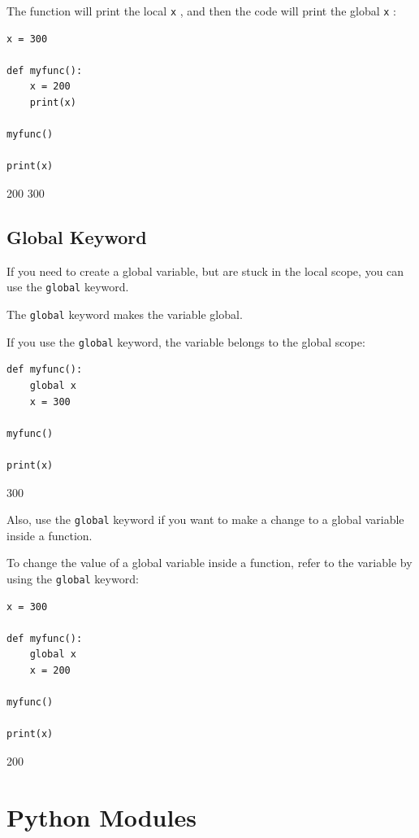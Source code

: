 \documentclass[12pt,a4paper]{article}
\newcommand{\code}[1]{%
	\colorbox{backcolour}{\lstinline{#1}}%
}
\newcommand{\lcode}[1]{%
	\lstinline{#1}%
}
\begin{document}
\begin{ebox}
The function will print the local \lcode{x}, and then the code will print the global \lcode{x}:
	\begin{lstlisting}
x = 300

def myfunc():
    x = 200
    print(x)

myfunc()

print(x)
	\end{lstlisting}
\tcblower
	\begin{vercode}
200
300
	\end{vercode}
\end{ebox}
\subsection{Global Keyword}

If you need to create a global variable, but are stuck in the local scope,
you can use the \code{global} keyword.

The \code{global} keyword makes the variable global.

\begin{ebox}
If you use the \lcode{global} keyword, the variable belongs to the global
scope:
	\begin{lstlisting}
def myfunc():
    global x
    x = 300

myfunc()

print(x)
	\end{lstlisting}
\tcblower
	\begin{vercode}
300
	\end{vercode}
\end{ebox}

Also, use the \code{global} keyword if you want to make a change to a
global variable inside a function.

\begin{ebox}
To change the value of a global variable inside a function, refer to the
variable by using the \lcode{global} keyword:
	\begin{lstlisting}
x = 300

def myfunc():
    global x
    x = 200

myfunc()

print(x)
	\end{lstlisting}
\tcblower
	\begin{vercode}
200
	\end{vercode}
\end{ebox}
\vfill\newpage
\section{Python Modules}\label{pyModules}
\end{document}
